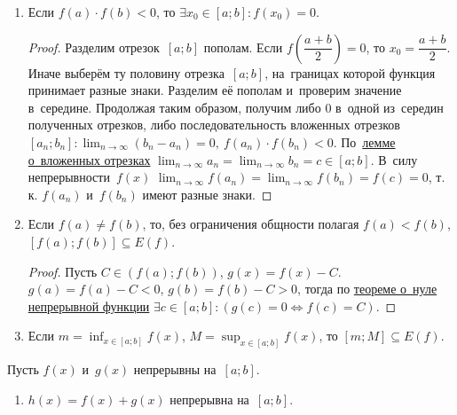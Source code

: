 \begin{enumerate}
	\item \begin{theorem}
	\label{th:zero_of_continuous_function}
	Если $f(a) \cdot f(b) < 0$, то $\exists x_0 \in [a; b] \colon f(x_0) = 0$.
	\end{theorem}
	\begin{proof}
	Разделим отрезок~$[a; b]$ пополам.
	Если $f\left( \dfrac{a + b}2 \right) = 0$, то $x_0 = \dfrac{a + b}2$.
	Иначе выберём ту половину отрезка~$[a; b]$, на~границах которой функция принимает разные знаки.
	Разделим её пополам и~проверим значение в~середине.
	Продолжая таким образом, получим либо $0$ в~одной из~середин полученных отрезков, либо последовательность вложенных отрезков~$\displaystyle [a_n; b_n] \colon \lim_{n \to \infty} (b_n - a_n) = 0, \ f(a_n) \cdot f(b_n) < 0$.
	По~\hyperref[lemma:about_nested_intervals]{лемме о~вложенных отрезках} $\displaystyle \lim_{n \to \infty} a_n = \lim_{n \to \infty} b_n = c \in [a; b]$.
	В~силу непрерывности~$f(x)$ $\displaystyle \lim_{n \to \infty} f(a_n) = \lim_{n \to \infty} f(b_n) = f(c) = 0$, т.\,к. $f(a_n)$ и~$f(b_n)$ имеют разные знаки.
	\end{proof}
	
	\item \begin{theorem}
	Если $f(a) \neq f(b)$, то, без ограничения общности полагая $f(a) < f(b)$, $[f(a); f(b)] \subseteq E(f)$.
	\end{theorem}
	\begin{proof}
	Пусть $C \in (f(a); f(b))$, $g(x) = f(x) - C$.
	$g(a) = f(a) - C < 0$, $g(b) = f(b) - C > 0$, тогда по \hyperref[th:zero_of_continuous_function]{теореме о~нуле непрерывной функции} $\exists c \in [a; b] \colon (g(c) = 0 \Leftrightarrow f(c) = C)$.
	\end{proof}
	
	\item Если $\displaystyle m = \inf_{x \in [a; b]} f(x)$, $\displaystyle M = \sup_{x \in [a; b]} f(x)$, то $[m; M] \subseteq E(f)$.
\end{enumerate}

Пусть $f(x)$ и~$g(x)$ непрерывны на~$[a; b]$.
\begin{enumerate}
	\item $h(x) = f(x) + g(x)$ непрерывна на~$[a; b]$.
\end{enumerate}